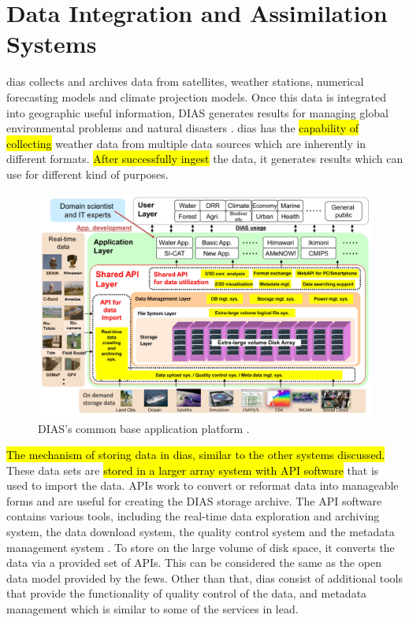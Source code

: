 \section{Data Integration and Assimilation Systems}
\label{se:dias}

\acrfull{dias} \cite{Kawasaki2018DataReduction} collects and archives data from satellites, weather stations, numerical forecasting models and climate projection models. Once this data is integrated into geographic useful information, DIAS generates results for managing global environmental problems and natural disasters \cite{Kawasaki2018DataReduction}. \acrshort{dias} has the \hl{capability of collecting} weather data from multiple data sources which are inherently in different formats. \hl{After successfully ingest} the data, it generates results which can use for different kind of purposes.

\begin{figure}[htp]
    \centering
    \includegraphics[width=1\textwidth]{lit/other/dias_common_base_application_platform.jpg}
    \caption[DIAS’s common base application platform.]{DIAS’s common base application platform \cite{Kawasaki2018DataReduction}.}
    \label{fi:dias_common_platform}
\end{figure}

\hl{The mechanism of storing data in \acrshort{dias}, similar to the other systems discussed.}
These data sets are \hl{stored in a larger array system with API software} that is used to import the data. APIs work to convert or reformat data into manageable forms and are useful for creating the DIAS storage archive. The API software contains various tools, including the real-time data exploration and archiving system, the data download system, the quality control system and the metadata management system \cite{Kawasaki2018DataReduction}. To store on the large volume of disk space, it converts the data via a provided set of APIs. This can be considered the same as the open data model provided by the \acrshort{fews}. Other than that, \acrshort{dias} consist of additional tools that provide the functionality of quality control of the data, and metadata management which is similar to some of the services in \acrshort{lead}.

